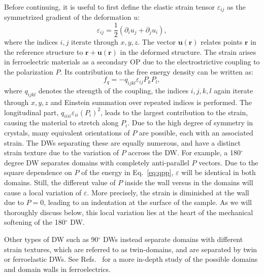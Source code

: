 Before continuing, it is useful to first define the elastic strain tensor $\varepsilon_{ij}$ as the symmetrized gradient of the deformation $u$:
\begin{equation}
\varepsilon_{ij} = \frac{1}{2}(\partial_i u_j + \partial_j u_i),
\end{equation}
where the indices $i,j$ iterate through $x, y, z$.
The vector $\bm{u}(\bm{r})$ relates points $\bm{r}$ in the reference structure to $\bm{r} + \bm{u}(\bm{r})$ in the deformed structure.
The strain arises in ferroelectric materials as a secondary OP due to the electrostrictive coupling to the polarization $P$.
Its contribution to the free energy density can be written as:
\begin{equation}
	f_{q}=-q_{ijkl}\varepsilon_{ij}P_{k}P_{l},\label{eq:qpp}
\end{equation}
where $q_{ijkl}$ denotes the strength of the coupling, the indices $i, j, k, l$ again iterate through $x, y, z$ and Einstein summation over repeated indices is performed.
The longitudinal part, $q_{iiii} \varepsilon_{ii} (P_i)^2$, leads to the largest contribution to the strain, causing the material to stretch along $P_i$.
Due to the high degree of symmetry in crystals, many equivalent orientations of $P$ are possible, each with an associated strain. The DWs separating these are equally numerous, and have a distinct strain texture due to the variation of $P$ accross the DW.
For example, a 180$^\circ$ degree DW separates domains with completely anti-parallel $P$ vectors.
Due to the square dependence on $P$ of the energy in Eq.~\eqref{eq:qpp}, $\varepsilon$ will be identical in both domains. Still, the different value of $P$ inside the wall versus in the domains will cause a local variation of $\varepsilon$. More precisely, the strain is diminished at the wall due to $P=0$, leading to an indentation at the surface of the sample.
As we will thoroughly discuss below, this local variation lies at the heart of the mechanical softening of the 180$^\circ$ DW.

Other types of DW such as 90$^\circ$ DWs instead separate domains with different strain textures, which are referred to as twin-domains, and are separated by twin or ferroelastic DWs.
See Refs.~\cite{Cao1991,Hu1998,Marton2010} for a more in-depth study of the possible domains and domain walls in ferroelectrics.

